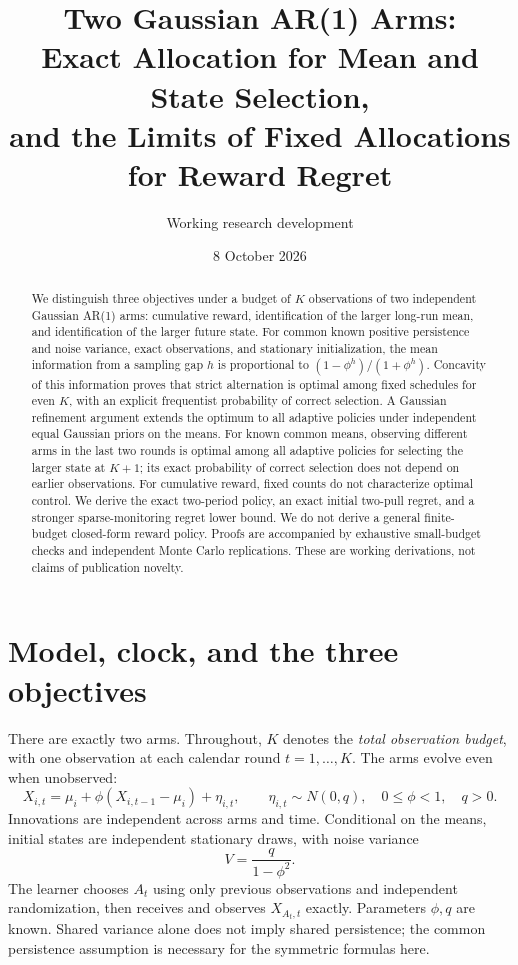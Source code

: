 \documentclass[11pt]{article}
\title{Two Gaussian AR(1) Arms:\\Exact Allocation for Mean and State Selection,\\and the Limits of Fixed Allocations for Reward Regret}
\author{Working research development}
\date{8 October 2026}
\begin{document}
\maketitle
\begin{abstract}
We distinguish three objectives under a budget of $K$ observations of two independent Gaussian AR(1) arms: cumulative reward, identification of the larger long-run mean, and identification of the larger future state. For common known positive persistence and noise variance, exact observations, and stationary initialization, the mean information from a sampling gap $h$ is proportional to $(1-\phi^h)/(1+\phi^h)$. Concavity of this information proves that strict alternation is optimal among fixed schedules for even $K$, with an explicit frequentist probability of correct selection. A Gaussian refinement argument extends the optimum to all adaptive policies under independent equal Gaussian priors on the means. For known common means, observing different arms in the last two rounds is optimal among all adaptive policies for selecting the larger state at $K+1$; its exact probability of correct selection does not depend on earlier observations. For cumulative reward, fixed counts do not characterize optimal control. We derive the exact two-period policy, an exact initial two-pull regret, and a stronger sparse-monitoring regret lower bound. We do not derive a general finite-budget closed-form reward policy. Proofs are accompanied by exhaustive small-budget checks and independent Monte Carlo replications. These are working derivations, not claims of publication novelty.
\end{abstract}

\section{Model, clock, and the three objectives}
There are exactly two arms. Throughout, $K$ denotes the \emph{total observation budget}, with one observation at each calendar round $t=1,\ldots,K$. The arms evolve even when unobserved:
\begin{equation}
X_{i,t}=\mu_i+\phi(X_{i,t-1}-\mu_i)+\eta_{i,t},\qquad
\eta_{i,t}\sim N(0,q),\quad 0\leq\phi<1,\quad q>0.
\label{eq:model}
\end{equation}
Innovations are independent across arms and time. Conditional on the means, initial states are independent stationary draws, with noise variance
\begin{equation}
V=\frac{q}{1-\phi^2}.
\end{equation}
The learner chooses $A_t$ using only previous observations and independent randomization, then receives and observes $X_{A_t,t}$ exactly. Parameters $\phi,q$ are known. Shared variance alone does not imply shared persistence; the common persistence assumption is necessary for the symmetric formulas here.
\end{document}
